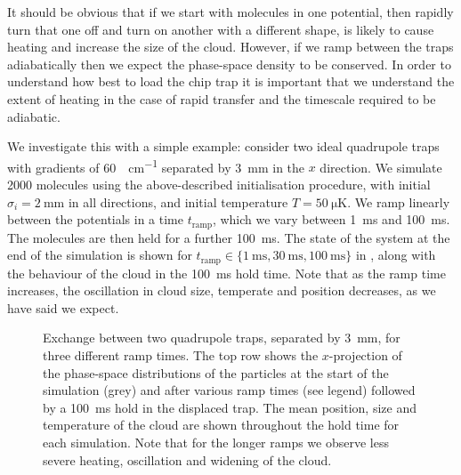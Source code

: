 It should be obvious that if we start with molecules in one potential, then
rapidly turn that one off and turn on another with a different shape, is likely
to cause heating and increase the size of the cloud.  However, if we ramp
between the traps adiabatically then we expect the phase-space density to be
conserved. In order to understand how best to load the chip trap it is
important that we understand the extent of heating in the case of rapid
transfer and the timescale required to be adiabatic.

We investigate this with a simple example: consider two ideal quadrupole traps
with gradients of \SI{60}{\gauss\per\centi\meter} separated by
\SI{3}{\milli\meter} in the $x$ direction. We simulate 2000 \CaF{} molecules
using the above-described initialisation procedure, with initial $\sigma_i =
\SI{2}{\milli\meter}$ in all directions, and initial temperature
$T=\SI{50}{\micro\kelvin}$. We ramp linearly between the potentials in a time
$t_\text{ramp}$, which we vary between \SI{1}{\milli\second} and
\SI{100}{\milli\second}. The molecules are then held for a further
\SI{100}{\milli\second}. The state of the system at the end of the simulation
is shown for $t_\text{ramp}\in \{\SI{1}{\milli\second}, \SI{30}{\milli\second},
\SI{100}{\milli\second}\}$ in , along with the
behaviour of the cloud in the \SI{100}{\milli\second} hold time. Note that as
the ramp time increases, the oscillation in cloud size, temperate and position
decreases, as we have said we expect.

\begin{figure}[p]
\centering
  \caption[Simulation of exchange between quadrupole traps]{
    Exchange between two quadrupole traps, separated by \SI{3}{\milli\meter},
    for three different ramp times. The top row shows the $x$-projection of the
    phase-space distributions of the particles at the start of the simulation
    (grey) and after various ramp times (see legend) followed by a
    \SI{100}{\milli\second} hold in the displaced trap. The mean position, size
    and temperature of the cloud are shown throughout the hold time for each
    simulation. Note that for the longer ramps we observe less severe heating,
    oscillation and widening of the cloud.
  }
  \label{sim:fig:adia3sim}
\end{figure}


